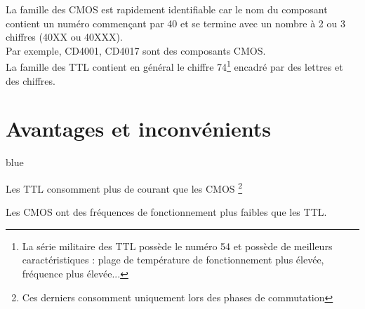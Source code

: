 La famille des CMOS est rapidement identifiable car le nom du composant contient un numéro commençant par 40 et se termine avec un nombre à 2 ou 3 chiffres (40XX ou 40XXX). \\

Par exemple, CD4001, CD4017 sont des composants CMOS. \\



La famille des TTL contient en général le chiffre 74\footnote{La série militaire des TTL possède le numéro 54 et possède de meilleurs caractéristiques : plage de température de fonctionnement plus élevée, fréquence plus élevée...} encadré par des lettres et des chiffres. \\





\section{Avantages et inconvénients}

\begin{items}{blue}{\Triangle}
    \item Les TTL consomment plus de courant que les CMOS \footnote{Ces derniers consomment uniquement lors des phases de commutation}
    \item Les CMOS ont des fréquences de fonctionnement plus faibles que les TTL.
\end{items}


